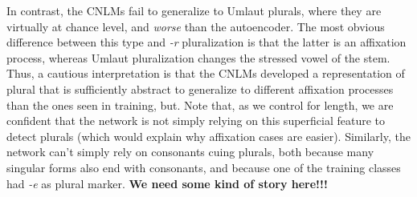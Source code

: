 In contrast, the CNLMs fail to generalize to Umlaut plurals, where
they are virtually at chance level, and \emph{worse} than the
autoencoder. The most obvious difference between this type and
\emph{-r} pluralization is that the latter is an affixation process,
whereas Umlaut pluralization changes the stressed vowel of the
stem. Thus, a cautious interpretation is that the CNLMs developed a
representation of plural that is sufficiently abstract to generalize
to different affixation processes than the ones seen in training,
but. Note that, as we control for length, we are confident that the
network is not simply relying on this superficial feature to detect
plurals (which would explain why affixation cases are
easier). Similarly, the network can't simply rely on consonants cuing
plurals, both because many singular forms also end with consonants, and
because one of the training classes had \emph{-e} as plural marker.
\textbf{We need some kind of story here!!!}
